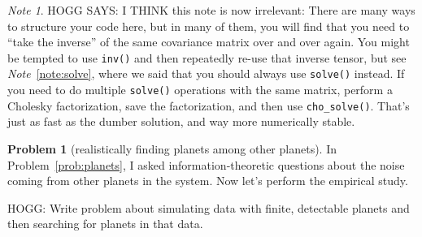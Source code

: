 \documentclass{article}
\theoremstyle{definition}
\newcommand{\problemname}{Problem}
\newtheorem{problem}{\problemname}
\newcommand{\probref}[1]{\problemname~\ref{#1}}
\theoremstyle{remark}
\newcommand{\notename}{Note}
\newtheorem{note}{\notename}[problem]
\newcommand{\noteref}[1]{\textit{\notename}~\ref{#1}}
\begin{document}
\begin{note}
HOGG SAYS: I THINK this note is now irrelevant:
There are many ways to structure your code here, but in many of them, you will find that you need to ``take the inverse'' of the same covariance matrix over and over again.
You might be tempted to use \texttt{inv()} and then repeatedly re-use that inverse tensor, but see \noteref{note:solve}, where we said that you should always use \texttt{solve()} instead.
If you need to do multiple \texttt{solve()} operations with the same matrix, perform a Cholesky factorization, save the factorization, and then use \texttt{cho\_solve()}.
That's just as fast as the dumber solution, and way more numerically stable.
\end{note}

\begin{problem}[realistically finding planets among other planets]\label{prob:planetsempirical}
In \probref{prob:planets}, I asked information-theoretic questions about the noise coming from other planets in the system.
Now let's perform the empirical study.

HOGG: Write problem about simulating data with finite, detectable planets and then searching for planets in that data.
\end{problem}
\end{document}
